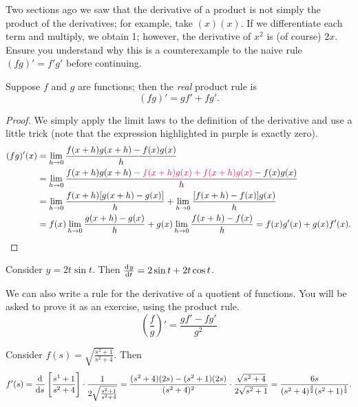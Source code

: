 


Two sections ago we saw that the derivative of a product is not simply the product of the derivatives;
for example, take $ (x)(x) $. If we differentiate each term and multiply, we obtain 1; however,
the derivative of $ x^2 $ is (of course) $ 2x $. Ensure you understand why this is a counterexample
to the naive rule $ (fg)' = f'g' $ before continuing.

Suppose $ f $ and $ g $ are functions; then the \textit{real} product rule is
\begin{displaymath}
  (fg)' = gf' + fg'.
\end{displaymath}

\begin{proof}
  We simply apply the limit laws to the definition of the derivative and use a little trick (note that the expression highlighted
  in purple is exactly zero).
  \begin{align*}
    (fg)'(x) &= \lim_{h\to 0} \frac{f(x + h)g(x + h) - f(x) g(x)}{h}\\
             &= \lim_{h \to 0} \frac{f(x + h) g(x + h) {\color{OrangeRed}{} - f(x + h)g(x) + f(x + h)g(x)} {}- f(x)g(x)}{h}\\
             &= \lim_{h \to 0} \frac{f(x + h)[g(x + h) - g(x)]}{h} + \lim_{h\to 0} \frac{[f(x + h) - f(x)]g(x)}{h}\\
             &= f(x) \lim_{h \to 0} \frac{g(x + h) - g(x)}{h} + g(x) \lim_{h\to 0} \frac{f(x + h) - f(x)}{h} = f(x) g'(x) + g(x) f'(x).
  \end{align*}
\end{proof}

\begin{ex}
  Consider $ y = 2t \sin t $. Then $ \od{y}{t} = 2 \sin t + 2t \cos t $.
\end{ex}

We can also write a rule for the derivative of a quotient of functions. You will be asked to
prove it as an exercise, using the product rule.
\begin{displaymath}
  \left( \frac{f}{g} \right)' = \frac{gf' - fg'}{g^2}
\end{displaymath}

\begin{ex}
  Consider $ f(s) = \sqrt{\frac{s^2 + 1}{s^2 + 4}} $. Then
  \begin{displaymath}
    f'(s) = \dod{}{s} \left[ \frac{s^1 + 1}{s^2 + 4} \right] \cdot \frac{1}{2\sqrt{\frac{s^2 + 1}{s^2 + 4}}}
          = \frac{(s^2 + 4)(2s) - (s^2 + 1)(2s)}{(s^2 + 4)^2} \cdot \frac{\sqrt{s^2 + 4}}{2\sqrt{s^2 + 1}}
          = \frac{6s}{(s^2 + 4)^{\frac{3}{2}} (s^2 + 1)^{\frac{1}{2}}}.
  \end{displaymath}
\end{ex}

